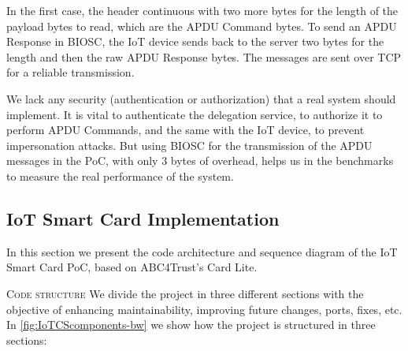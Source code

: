 In the first case, the header continuous with two more bytes for the length of the payload bytes to read, which are the APDU Command bytes.
To send an APDU Response in BIOSC, the IoT device sends back to the server two bytes for the length and then the raw APDU Response bytes. The messages are sent over TCP for a reliable transmission.

We lack any security (authentication or authorization) that a real system should implement. It is vital to authenticate the delegation service, to authorize it to perform APDU Commands, and the same with the IoT device, to prevent impersonation attacks. But using BIOSC for the transmission of the APDU messages in the PoC, with only 3 bytes of overhead, helps us in the  benchmarks to measure the real performance of the system.


\subsection{IoT Smart Card Implementation}

In this section we present the code architecture and sequence diagram of the IoT Smart Card PoC, based on ABC4Trust's Card Lite.

\hfil

\textsc{Code structure}
We divide the project in three different sections with the objective of enhancing maintainability, improving future changes, ports, fixes, etc.
In \autoref{fig:IoTCScomponents-bw} we show how the project is structured in three sections:


